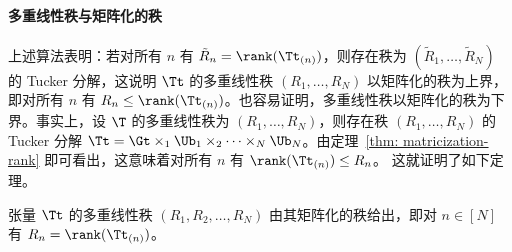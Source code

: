 \paragraph{多重线性秩与矩阵化的秩}
上述算法表明：若对所有 $n$ 有 $\tilde R_n = \rank(\Tt_{(n)})$，则存在秩为 $(\tilde R_1,\dots, \tilde R_N)$ 的 Tucker 分解，这说明 $\Tt$ 的多重线性秩 $( R_1,\dots, R_N)$ 以矩阵化的秩为上界，即对所有 $n$ 有 $ R_n \leq \rank(\Tt_{(n)} )$。也容易证明，多重线性秩以矩阵化的秩为下界。事实上，设 $\T$ 的多重线性秩为 $(R_1,\dots, R_N)$，则存在秩 $(R_1,\dots, R_N)$ 的 Tucker 分解 $\Tt = \Gt\times_1\Ub_1\times_2 \dots \times_N \Ub_N$。由定理~\ref{thm: matricization-rank} 即可看出，这意味着对所有 $n$ 有 $\rank(\Tt_{(n)} )\leq  R_n$。
这就证明了如下定理。
\begin{theorem}
张量 $\Tt$ 的多重线性秩 $(R_1,R_2,\dots, R_N)$ 由其矩阵化的秩给出，即对 $n\in[N]$ 有 $R_n = \rank(\Tt_{(n)})$。
\end{theorem}


